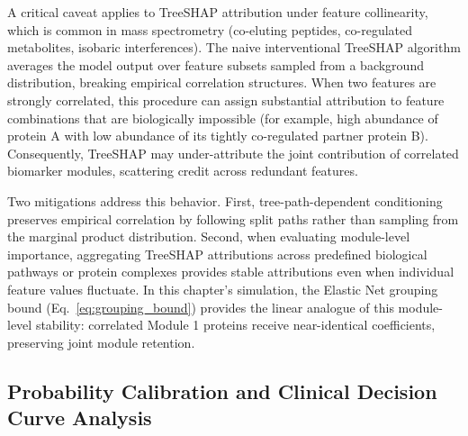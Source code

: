 \documentclass[11pt,oneside]{book}
\begin{document}
A critical caveat applies to TreeSHAP attribution under feature collinearity, which is common in mass spectrometry (co-eluting peptides, co-regulated metabolites, isobaric interferences). The naive interventional TreeSHAP algorithm averages the model output over feature subsets sampled from a background distribution, breaking empirical correlation structures. When two features are strongly correlated, this procedure can assign substantial attribution to feature combinations that are biologically impossible (for example, high abundance of protein A with low abundance of its tightly co-regulated partner protein B). Consequently, TreeSHAP may under-attribute the joint contribution of correlated biomarker modules, scattering credit across redundant features.

Two mitigations address this behavior. First, tree-path-dependent conditioning \cite{lundberg2020local} preserves empirical correlation by following split paths rather than sampling from the marginal product distribution. Second, when evaluating module-level importance, aggregating TreeSHAP attributions across predefined biological pathways or protein complexes provides stable attributions even when individual feature values fluctuate. In this chapter's simulation, the Elastic Net grouping bound (Eq.~\ref{eq:grouping_bound}) provides the linear analogue of this module-level stability: correlated Module 1 proteins receive near-identical coefficients, preserving joint module retention.

\subsection{Probability Calibration and Clinical Decision Curve Analysis}
\end{document}
